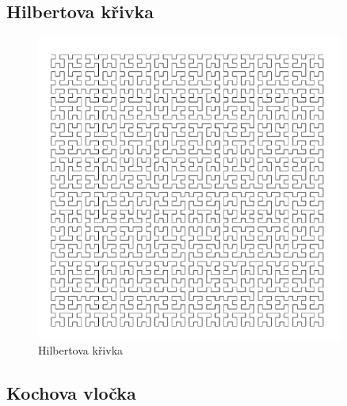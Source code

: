 \subsection{Hilbertova křivka}



\begin{figure}[p]
  \centering
  \includegraphics[width=0.9\textwidth]{krunimir/examples/hilbert}
  \caption{Hilbertova křivka}\label{fig:krunimir-hilbert}
\end{figure}

\subsection{Kochova vločka}



